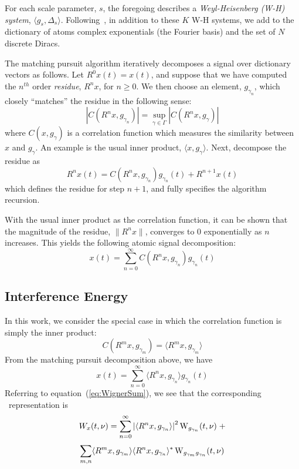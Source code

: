 For each scale parameter, $s$, the foregoing describes a 
\emph{Weyl-Heisenberg (W-H) system}, $\langle g_s,\Delta_s \rangle$.
Following~, in 
addition to these $K$ W-H systems, we add to the dictionary of atoms complex
exponentials (the Fourier basis) and the set of $N$ discrete Diracs.

The matching pursuit algorithm iteratively decomposes a signal over
dictionary vectors as follows.
Let $R^0x(t)=x(t)$, and suppose that we have computed the $n^{th}$
order \emph{residue}, $R^nx$, for $n\geq 0$.  We then choose an
element, $g_{\gamma_n}$, which closely ``matches'' the residue in the
following sense:
\[
|C(R^nx,g_{\gamma_n})| = \sup_{\gamma \in \Gamma} |C(R^nx,g_\gamma)|
\]
where $C(x,g_\gamma)$ is a correlation function which measures the
similarity between $x$ and $g_\gamma$.  An example is the usual inner
product, $\langle x,g_\gamma \rangle$.
Next, decompose the residue as 
\[
R^nx(t) = C(R^nx,g_{\gamma_n})g_{\gamma_n}(t) + R^{n+1}x(t)
\]
which defines the residue for step $n+1$, and fully specifies the
algorithm recursion.  

With the usual inner product as the correlation function, it can be
shown \cite{Mallat:1998} that the magnitude of the residue,
$\|R^nx\|$, converges to 0 exponentially as $n$ increases.  This yields
the following atomic signal decomposition:
\begin{equation}\label{eq:MP}
x(t) = \sum_{n=0}^\infty C(R^nx,g_{\gamma_n})g_{\gamma_n}(t) 
\end{equation}

\subsection{Interference Energy}
\label{sec:energy-separation}
In this work, we consider the special case in which the correlation function
is simply the inner product:
\[
C(R^mx,g_{\gamma_m}) = \langle R^mx,g_{\gamma_m}\rangle
\]
From the matching pursuit decomposition above, we have
\[%
x(t) = \sum_{n=0}^\infty \langle R^nx,g_{\gamma_n} \rangle g_{\gamma_n}(t) 
\]%
Referring to equation~(\ref{eq:WignerSum}), we see that the 
corresponding \WV\ representation is
\begin{equation*}%
W_x(t,\nu) = \sum_{n=0}^\infty 
    \left|\langle R^nx,g_{\gamma_n} \rangle \right|^2 
\W_{g_{\gamma_n}}(t,\nu)\;+
\end{equation*}
\begin{equation}\label{eq:WVMP}
\sum_{m,n}
\langle R^mx,g_{\gamma_m}\rangle \langle R^nx,g_{\gamma_n}\rangle^*
\operatorname{W}_{g_{\gamma_m}g_{\gamma_n}}(t,\nu)
\end{equation}

